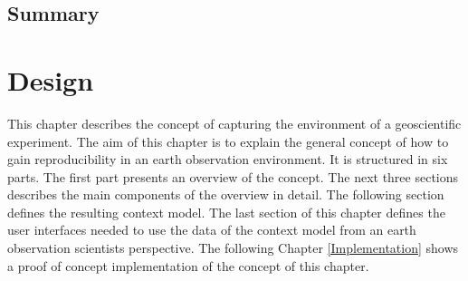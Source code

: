 \documentclass[draft,final]{vutinfth} %
\begin{document}

\section{Summary}



 
\chapter{Design}\label{Design}
This chapter describes the concept of capturing the environment of a geoscientific experiment. The aim of this chapter is to explain the general concept of how to gain reproducibility in an earth observation environment. It is structured in six parts. The first part presents an overview of the concept. The next three sections describes the main components of the overview in detail. The following section defines the resulting context model. The last section of this chapter defines the user interfaces needed to use the data of the context model from an earth observation scientists perspective. The following Chapter \ref{Implementation} shows a proof of concept implementation of the concept of this chapter. 
\end{document}
